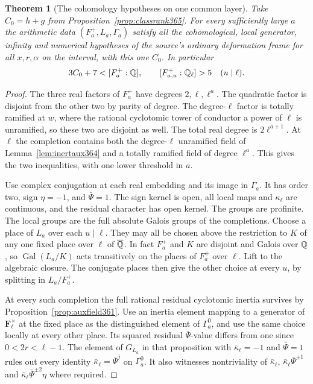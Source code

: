 \documentclass[a4paper,11pt]{article}
\newtheorem{theorem}[proposition]{Theorem}
\theoremstyle{definition}
\theoremstyle{remark}
\numberwithin{equation}{section}
\begin{document}
\begin{theorem}[The cohomology hypotheses on one common layer]
\label{thm:commonframe365}
Take \(C_0=h+g\) from Proposition~\ref{prop:classrank365}.
For every sufficiently large \(a\) the arithmetic data
\((F_a^+,L_a,\Gamma_a)\) satisfy all the cohomological,
local generator, infinity and numerical hypotheses of the
source's ordinary deformation frame for all \(x,r,\alpha\)
on the interval, with this one \(C_0\). In particular
\[
    3C_0+7<[F_a^+:\mathbb Q],\qquad [F_{a,u}^+:\mathbb Q_\ell]>5
                      \quad(u\mid\ell).
\]
\end{theorem}
\begin{proof}
The three real factors of \(F_a^+\) have degrees \(2,\ell,\ell^a\).
The quadratic factor is disjoint from the other two by parity
of degree. The degree-\(\ell\) factor is totally ramified at
\(w\), where the rational cyclotomic tower of conductor a power
of \(\ell\) is unramified, so these two are disjoint as well.
The total real degree is \(2\ell^{a+1}\). At \(\ell\) the
completion contains both the degree-\(\ell\) unramified field
of Lemma~\ref{lem:inertaux364} and a totally ramified field
of degree \(\ell^a\). This gives the two inequalities, with
one lower threshold in \(a\).

Use complex conjugation at each real embedding and its image
in \(\Gamma_a\). It has order two, sign \(\eta=-1\), and
\(\bar\Psi=1\). The sign kernel is open, all local maps
and \(\kappa_\ell\) are continuous, and the residual character
has open kernel. The groups are profinite. The local groups
are the full absolute Galois groups of the completions.
Choose a place of \(L_a\) over each \(u\mid\ell\). They may
all be chosen above the restriction to \(K\) of any one fixed
place over \(\ell\) of \(\overline{\mathbb Q}\). In fact \(F_a^+\)
and \(K\) are disjoint and Galois over \(\mathbb Q\), so
\(\operatorname{Gal}(L_a/K)\) acts transitively on the
places of \(F_a^+\) over \(\ell\). Lift to the algebraic
closure. The conjugate places then give the other choice at
every \(u\), by splitting in \(L_a/F_a^+\).

At every such completion the full rational residual cyclotomic
inertia survives by Proposition~\ref{prop:auxfield361}.
Use an inertia element mapping to a generator of
\(\mathbf F_\ell^\times\) at the fixed place as the
distinguished element of \(\Gamma_a^0\), and use the same
choice locally at every other place. Its squared residual
\(\bar\Psi\)-value differs from one since \(0<2r<\ell-1\).
The element of \(G_{L_a}\) in that proposition with
\(\bar\kappa_\ell=-1\) and \(\bar\Psi=1\) rules out every
identity \(\bar\kappa_\ell=\bar\Psi^j\) on \(\Gamma_a^0\).
It also witnesses nontriviality of
\(\bar\kappa_\ell\), \(\bar\kappa_\ell\bar\Psi^{\pm1}\)
and \(\bar\kappa_\ell\bar\Psi^{\pm2}\eta\) where required.


\end{proof}
\end{document}
